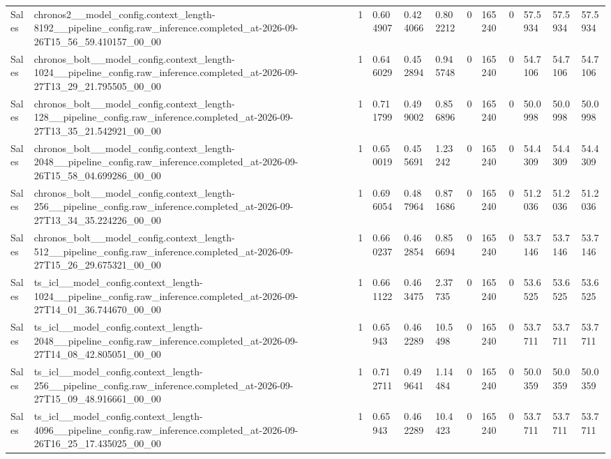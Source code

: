 \begin{tabular}{llllllllllll}
Sales & chronos2\_\_model\_config.context\_length-8192\_\_pipeline\_config.raw\_inference.completed\_at-2026-09-26T15\_56\_59.410157\_00\_00 & 1 & 0.604907 & 0.424066 & 0.802212 & 0 & 165240 & 0 & 57.5934 & 57.5934 & 57.5934 \\
Sales & chronos\_bolt\_\_model\_config.context\_length-1024\_\_pipeline\_config.raw\_inference.completed\_at-2026-09-27T13\_29\_21.795505\_00\_00 & 1 & 0.646029 & 0.452894 & 0.945748 & 0 & 165240 & 0 & 54.7106 & 54.7106 & 54.7106 \\
Sales & chronos\_bolt\_\_model\_config.context\_length-128\_\_pipeline\_config.raw\_inference.completed\_at-2026-09-27T13\_35\_21.542921\_00\_00 & 1 & 0.711799 & 0.499002 & 0.856896 & 0 & 165240 & 0 & 50.0998 & 50.0998 & 50.0998 \\
Sales & chronos\_bolt\_\_model\_config.context\_length-2048\_\_pipeline\_config.raw\_inference.completed\_at-2026-09-26T15\_58\_04.699286\_00\_00 & 1 & 0.650019 & 0.455691 & 1.23242 & 0 & 165240 & 0 & 54.4309 & 54.4309 & 54.4309 \\
Sales & chronos\_bolt\_\_model\_config.context\_length-256\_\_pipeline\_config.raw\_inference.completed\_at-2026-09-27T13\_34\_35.224226\_00\_00 & 1 & 0.696054 & 0.487964 & 0.871686 & 0 & 165240 & 0 & 51.2036 & 51.2036 & 51.2036 \\
Sales & chronos\_bolt\_\_model\_config.context\_length-512\_\_pipeline\_config.raw\_inference.completed\_at-2026-09-27T15\_26\_29.675321\_00\_00 & 1 & 0.660237 & 0.462854 & 0.856694 & 0 & 165240 & 0 & 53.7146 & 53.7146 & 53.7146 \\
Sales & ts\_icl\_\_model\_config.context\_length-1024\_\_pipeline\_config.raw\_inference.completed\_at-2026-09-27T14\_01\_36.744670\_00\_00 & 1 & 0.661122 & 0.463475 & 2.37735 & 0 & 165240 & 0 & 53.6525 & 53.6525 & 53.6525 \\
Sales & ts\_icl\_\_model\_config.context\_length-2048\_\_pipeline\_config.raw\_inference.completed\_at-2026-09-27T14\_08\_42.805051\_00\_00 & 1 & 0.65943 & 0.462289 & 10.5498 & 0 & 165240 & 0 & 53.7711 & 53.7711 & 53.7711 \\
Sales & ts\_icl\_\_model\_config.context\_length-256\_\_pipeline\_config.raw\_inference.completed\_at-2026-09-27T15\_09\_48.916661\_00\_00 & 1 & 0.712711 & 0.499641 & 1.14484 & 0 & 165240 & 0 & 50.0359 & 50.0359 & 50.0359 \\
Sales & ts\_icl\_\_model\_config.context\_length-4096\_\_pipeline\_config.raw\_inference.completed\_at-2026-09-26T16\_25\_17.435025\_00\_00 & 1 & 0.65943 & 0.462289 & 10.4423 & 0 & 165240 & 0 & 53.7711 & 53.7711 & 53.7711 \\

\end{tabular}
